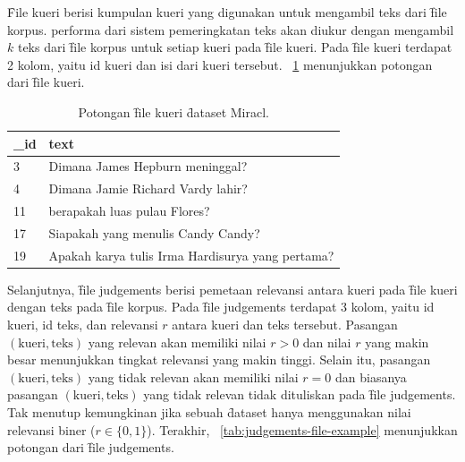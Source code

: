     \f{File} kueri berisi kumpulan kueri yang digunakan untuk mengambil teks dari \f{file} korpus. 
    performa dari sistem pemeringkatan teks akan diukur dengan mengambil $k$ teks dari \f{file} korpus untuk setiap kueri pada \f{file} kueri. Pada \f{file} kueri terdapat 2 kolom, yaitu id kueri dan isi dari kueri tersebut. \tab~\ref{tab:query-file-example} menunjukkan potongan dari \f{file} kueri.
    \begin{table}
        \centering
        \caption{Potongan \f{file} kueri \f{dataset} Miracl.}
        \label{tab:query-file-example}
        \begin{tabular}{|l|p{}|}
            \hline
            \textbf{\_id} & \textbf{text}                                                                 \\ \hline
            3             & Dimana James Hepburn meninggal?                                              \\ \hline
            4             & Dimana Jamie Richard Vardy lahir?                                            \\ \hline
            11            & berapakah luas pulau Flores?                                                 \\ \hline
            17            & Siapakah yang menulis Candy Candy?                                           \\ \hline
            19            & Apakah karya tulis Irma Hardisurya yang pertama?                              \\ \hline
        \end{tabular}
    \end{table}
    Selanjutnya, \f{file judgements} berisi pemetaan relevansi antara kueri pada \f{file} kueri dengan teks pada \f{file} korpus. Pada \f{file} judgements terdapat 3 kolom, yaitu id kueri, id teks, dan relevansi $r$ antara kueri dan teks tersebut. Pasangan $(\text{kueri}, \text{teks})$ yang relevan akan memiliki nilai $r > 0$ dan nilai $r$ yang makin besar menunjukkan tingkat relevansi yang makin tinggi. Selain itu, pasangan $(\text{kueri}, \text{teks})$ yang tidak relevan akan memiliki nilai $r = 0$ dan biasanya pasangan $(\text{kueri}, \text{teks})$ yang tidak relevan tidak dituliskan pada \f{file judgements}. Tak menutup kemungkinan jika sebuah \f{dataset} hanya menggunakan nilai relevansi biner ($r \in \{0, 1\}$). Terakhir, \tab~\ref{tab:judgements-file-example} menunjukkan potongan dari \f{file judgements}.
